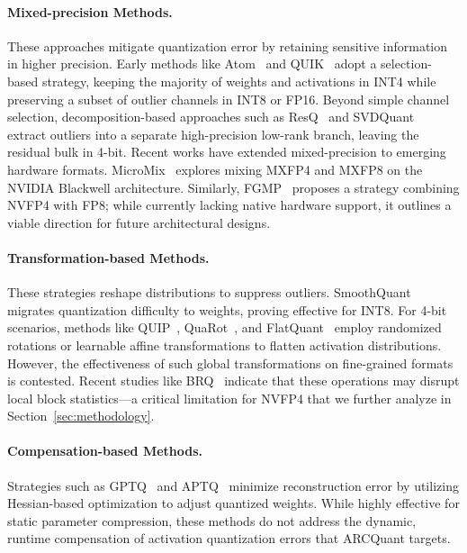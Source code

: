\documentclass[11pt]{article}
\begin{document}
\paragraph{Mixed-precision Methods.} These approaches mitigate quantization error by retaining sensitive information in higher precision.
Early methods like Atom~\citep{atom} and QUIK~\citep{QUIK} adopt a selection-based strategy, keeping the majority of weights and activations in INT4 while preserving a subset of outlier channels in INT8 or FP16.
Beyond simple channel selection, decomposition-based approaches such as ResQ~\citep{saxena2025resqmixedprecisionquantizationlarge} and SVDQuant~\citep{li2024svdquant} extract outliers into a separate high-precision low-rank branch, leaving the residual bulk in 4-bit.
Recent works have extended mixed-precision to emerging hardware formats.
MicroMix~\citep{liu2025micromix} explores mixing MXFP4 and MXFP8 on the NVIDIA Blackwell architecture.
Similarly, FGMP~\citep{hooper2025fgmpfinegrainedmixedprecisionweight} proposes a strategy combining NVFP4 with FP8; while currently lacking native hardware support, it outlines a viable direction for future architectural designs.

\paragraph{Transformation-based Methods.} These strategies reshape distributions to suppress outliers. SmoothQuant~\citep{xiao2024smoothquantaccurateefficientposttraining} migrates quantization difficulty to weights, proving effective for INT8. For 4-bit scenarios, methods like QUIP~\citep{tseng2024quip}, QuaRot~\citep{ashkboos2024quarot}, and FlatQuant~\citep{sun2024flatquant} employ randomized rotations or learnable affine transformations to flatten activation distributions. However, the effectiveness of such global transformations on fine-grained formats is contested. Recent studies like BRQ~\citep{shao2025block} indicate that these operations may disrupt local block statistics—a critical limitation for NVFP4 that we further analyze in Section~\ref{sec:methodology}.

\paragraph{Compensation-based Methods.}
Strategies such as GPTQ~\citep{frantar2023gptqaccurateposttrainingquantization} and APTQ~\citep{guan2024aptq} minimize reconstruction error by utilizing Hessian-based optimization to adjust quantized weights.
While highly effective for static parameter compression, these methods do not address the dynamic, runtime compensation of activation quantization errors that ARCQuant targets.
\end{document}
